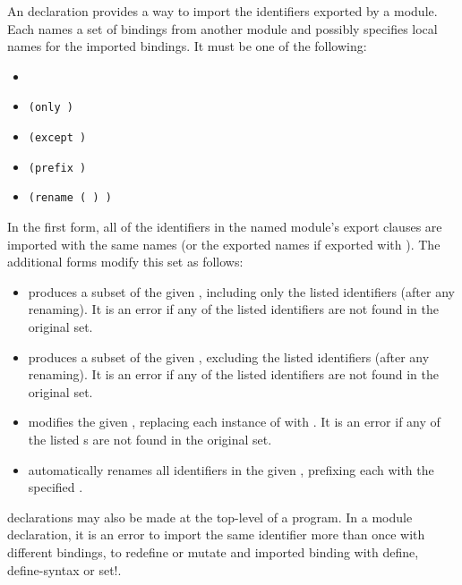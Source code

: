 An  declaration provides a way to import the identifiers
exported by a module.  Each  names a set of bindings
from another module and possibly specifies local names for the
imported bindings. It must be one of the following:

\begin{itemize}
\item {\tt{}}
\item {\tt(only   \dotsfoo)}
\item {\tt(except   \dotsfoo)}
\item {\tt(prefix  )}
\item {\tt(rename  ( ) \dotsfoo)}
\end{itemize}

In the first form, all of the identifiers in the named module's export
clauses are imported with the same names (or the exported names if
exported with ).  The additional 
forms modify this set as follows:

\begin{itemize}

\item {} produces a subset of the given
  , including only the listed identifiers (after any
  renaming).  It is an error if any of the listed identifiers are
  not found in the original set.

\item {} produces a subset of the given
  , excluding the listed identifiers (after any
  renaming). It is an error if any of the listed identifiers are not
  found in the original set.

\item {} modifies the given ,
  replacing each instance of  with
  . It is an error if any of the listed
  s are not found in the original set.

\item {} automatically renames all identifiers in
  the given , prefixing each with the specified
  .

\end{itemize}

 declarations may also be made at the top-level of a
program.  In a module declaration, it is an error to import the same
identifier more than once with different bindings, to redefine or
mutate and imported binding with {\cf define}, {\cf define-syntax}
or {\cf set!}.

